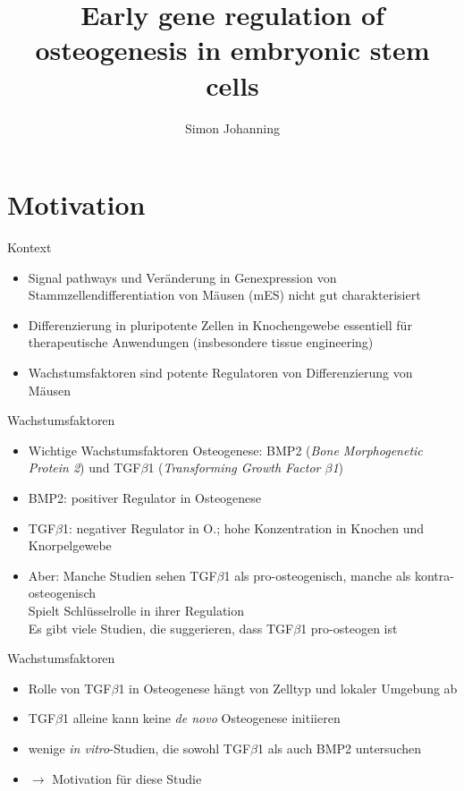 \documentclass[handout]{beamer}
\author[Johanning]{Simon Johanning}
\title{Early gene regulation of osteogenesis in embryonic stem cells}
\institute{Institut f\"ur Mathematik und Informatik der Universit\"at Leipzig}
\begin{document}
	
\watermarkoff

\begin{frame}[t,plain]
	\titlepage
\end{frame}

\section{Motivation}

\begin{frame}{Kontext}
\begin{itemize}
	\item Signal pathways und Ver\"anderung in Genexpression von Stammzellendifferentiation von M\"ausen (mES) nicht gut charakterisiert
	\pause
	\item Differenzierung in pluripotente Zellen in Knochengewebe essentiell f\"ur therapeutische Anwendungen (insbesondere tissue engineering)
	\pause
	\item Wachstumsfaktoren sind potente Regulatoren von Differenzierung 	von M\"ausen
\end{itemize}
\end{frame}

\begin{frame}{Wachstumsfaktoren}
\begin{itemize}
	\item Wichtige Wachstumsfaktoren Osteogenese: BMP2 (\emph{Bone Morphogenetic Protein 2}) und TGF$\beta$1 (\emph{Transforming Growth Factor $\beta$1})
	\pause
	\item BMP2: positiver Regulator in Osteogenese
	\pause
	\item TGF$\beta$1: negativer Regulator in O.; hohe Konzentration in Knochen und Knorpelgewebe
	\pause
	\item Aber: Manche Studien sehen TGF$\beta$1 als pro-osteogenisch, manche als kontra-osteogenisch
	\pause
	\\ Spielt Schl\"usselrolle in ihrer Regulation
	\pause
	\\ Es gibt viele Studien, die suggerieren, dass TGF$\beta$1 pro-osteogen ist
\end{itemize}
\end{frame}

\begin{frame}{Wachstumsfaktoren}
\begin{itemize}
	\item Rolle von TGF$\beta$1 in Osteogenese h\"angt von Zelltyp und lokaler Umgebung ab
	\pause
	\item TGF$\beta$1 alleine kann keine \emph{de novo} Osteogenese initiieren
	\pause
	\item wenige \emph{in vitro}-Studien, die sowohl TGF$\beta$1 als auch BMP2 untersuchen
	\pause
	\item $\rightarrow$ Motivation f\"ur diese Studie
\end{itemize}
\end{frame}
\end{document}
